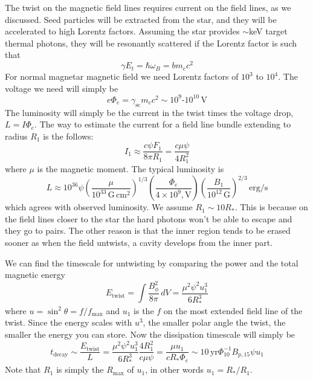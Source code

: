 \documentclass[letterpaper, 11pt]{article}
\numberwithin{equation}{section}
\numberwithin{figure}{section}
\begin{document}
The twist on the magnetic field lines requires current on the field lines, as we discussed. Seed particles will be extracted from the star, and they will be accelerated to high Lorentz factors. Assuming the star provides $\sim$keV target thermal photons, they will be resonantly scattered if the Lorentz factor is such that
\begin{equation}
    \label{eq:86}
    \gamma E_t = \hbar \omega_B = bm_ec^2
\end{equation}
For normal magnetar magnetic field we need Lorentz factors of $10^3$ to $10^4$. The voltage we need will simply be
\begin{equation}
    \label{eq:85}
    e\Phi_e = \gamma_\mathrm{sc}m_ec^2 \sim 10^9\text{-}10^{10}\,\mathrm{V}
\end{equation}
The luminosity will simply be the current in the twist times the voltage drop, $L = I\Phi_e$. The way to estimate the current for a field line bundle extending to radius $R_1$ is the follows:
\begin{equation}
    \label{eq:87}
    I_1 \approx \frac{c\psi F_1}{8\pi R_1} = \frac{c\mu \psi}{4R_1^2}
\end{equation}
where $\mu$ is the magnetic moment. The typical luminosity is
\begin{equation}
    \label{eq:88}
    L\approx 10^{36}\psi \left( \frac{\mu}{10^{33}\,\mathrm{G\,cm^2}} \right)^{1/3} \left( \frac{\Phi_e}{4\times 10^9,\mathrm{V}} \right) \left( \frac{B_1}{10^{12}\, \mathrm{G}} \right)^{2/3}\,\mathrm{erg/s}
\end{equation}
which agrees with observed luminosity. We assume $R_1\sim 10R_{*}$. This is because on the field lines closer to the star the hard photons won't be able to escape and they go to pairs. The other reason is that the inner region tends to be erased sooner as when the field untwists, a cavity develops from the inner part.

We can find the timescale for untwisting by comparing the power and the total magnetic energy
\begin{equation}
    \label{eq:89}
    E_\mathrm{twist} = \int \frac{B_{\phi}^2}{8\pi}\,dV = \frac{\mu^2\psi^2u_1^3}{6R^3_{*}}
\end{equation}
where $u = \sin^2\theta = f/f_\mathrm{max}$ and $u_1$ is the $f$ on the most extended field line of the twist. Since the energy scales with $u^3$, the smaller polar angle the twist, the smaller the energy you can store. Now the dissipation timescale will simply be
\begin{equation}
    \label{eq:90}
    t_\mathrm{decay} \sim \frac{E_\mathrm{twist}}{L} = \frac{\mu^2\psi^2u_1^3}{6R^3_{*}}\frac{4R_1^2}{c\mu \psi} = \frac{\mu u_1}{cR_{*}\Phi_e} \sim 10\,\mathrm{yr}\Phi_{10}^{-1}B_{p,15}\psi u_1
\end{equation}
Note that $R_1$ is simply the $R_\mathrm{max}$ of $u_1$, in other words $u_1 = R_{*}/R_1$.
\end{document}
